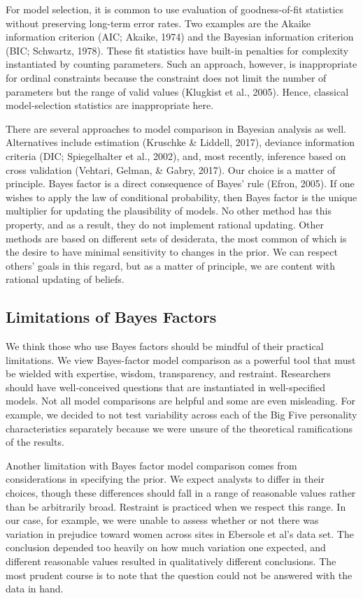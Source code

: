 \documentclass[english,man]{apa6}
\theoremstyle{definition}
\theoremstyle{definition}
\theoremstyle{remark}
\begin{document}
For model selection, it is common to use evaluation of goodness-of-fit
statistics without preserving long-term error rates. Two examples are
the Akaike information criterion (AIC; Akaike, 1974) and the Bayesian
information criterion (BIC; Schwartz, 1978). These fit statistics have
built-in penalties for complexity instantiated by counting parameters.
Such an approach, however, is inappropriate for ordinal constraints
because the constraint does not limit the number of parameters but the
range of valid values (Klugkist et al., 2005). Hence, classical
model-selection statistics are inappropriate here.

There are several approaches to model comparison in Bayesian analysis as
well. Alternatives include estimation (Kruschke \& Liddell, 2017),
deviance information criteria (DIC; Spiegelhalter et al., 2002), and,
most recently, inference based on cross validation (Vehtari, Gelman, \&
Gabry, 2017). Our choice is a matter of principle. Bayes factor is a
direct consequence of Bayes' rule (Efron, 2005). If one wishes to apply
the law of conditional probability, then Bayes factor is the unique
multiplier for updating the plausibility of models. No other method has
this property, and as a result, they do not implement rational updating.
Other methods are based on different sets of desiderata, the most common
of which is the desire to have minimal sensitivity to changes in the
prior. We can respect others' goals in this regard, but as a matter of
principle, we are content with rational updating of beliefs.

\subsection{Limitations of Bayes
Factors}\label{limitations-of-bayes-factors}

We think those who use Bayes factors should be mindful of their
practical limitations. We view Bayes-factor model comparison as a
powerful tool that must be wielded with expertise, wisdom, transparency,
and restraint. Researchers should have well-conceived questions that are
instantiated in well-specified models. Not all model comparisons are
helpful and some are even misleading. For example, we decided to not
test variability across each of the Big Five personality characteristics
separately because we were unsure of the theoretical ramifications of
the results.

Another limitation with Bayes factor model comparison comes from
considerations in specifying the prior. We expect analysts to differ in
their choices, though these differences should fall in a range of
reasonable values rather than be arbitrarily broad. Restraint is
practiced when we respect this range. In our case, for example, we were
unable to assess whether or not there was variation in prejudice toward
women across sites in Ebersole et al's data set. The conclusion depended
too heavily on how much variation one expected, and different reasonable
values resulted in qualitatively different conclusions. The most prudent
course is to note that the question could not be answered with the data
in hand.
\end{document}

